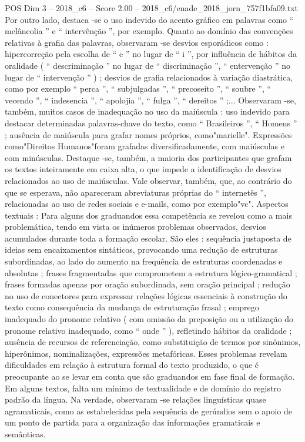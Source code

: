 \begin{textsample}{POS Dim 3 – 2018\_c6 – Score 2.00 – 2018\_c6/enade\_2018\_jorn\_757f1bfa09.txt}
Por outro lado, destaca -se o uso indevido do acento gráfico em palavras como “ melâncolia ” e “ intervênção ”, por exemplo.
Quanto ao domínio das convenções relativas à grafia das palavras, observaram -se desvios esporádicos como : hipercorreção pela escolha de “ e ” no lugar de “ i ”, por influência de hábitos da oralidade ( “ descriminação ” no lugar de “ discriminação ”, “ entervenção ” no lugar de “ intervenção ” ) ; desvios de grafia relacionados à variação diastrática, como por exemplo “ perca ”, “ subjulgadas ”, “ precoseito ”, “ soubre ”, “ vecendo ”, “ indesencia ”, “ apolojia ”, “ fulga ”, “ dereitos ” ;...
Observaram -se, também, muitos casos de inadequação no uso da maiúscula : uso indevido para destacar determinadas palavras-chave do texto, como “ Brasileiros ”, “ Homens ” ; ausência de maiúscula para grafar nomes próprios, como"marielle".
Expressões como"Direitos Humanos"foram grafadas diversificadamente, com maiúsculas e com minúsculas.
Destaque -se, também, a maioria dos participantes que grafam os textos inteiramente em caixa alta, o que impede a identificação de desvios relacionados ao uso de maiúsculas.
Vale observar, também, que, ao contrário do que se esperava, não apareceram abreviaturas próprias do “ internetês ”, relacionadas ao uso de redes sociais e e-mails, como por exemplo"vc".
Aspectos textuais : Para alguns dos graduandos essa competência se revelou como a mais problemática, tendo em vista os inúmeros problemas observados, desvios acumulados durante toda a formação escolar.
São eles : sequência justaposta de ideias sem encaixamentos sintáticos, provocando uma redução de estruturas subordinadas, ao lado do aumento na frequência de estruturas coordenadas e absolutas ; frases fragmentadas que comprometem a estrutura lógico-gramatical ; frases formadas apenas por oração subordinada, sem oração principal ; redução no uso de conectores para expressar relações lógicas essenciais à construção do texto como consequência da mudança de estruturação frasal ; emprego inadequado do pronome relativo ( com omissão da preposição ou a utilização do pronome relativo inadequado, como “ onde ” ), refletindo hábitos da oralidade ; ausência de recursos de referenciação, como substituição de termos por sinônimos, hiperônimos, nominalizações, expressões metafóricas.
Esses problemas revelam dificuldades em relação à estrutura formal do texto produzido, o que é preocupante ao se levar em conta que são graduandos em fase final de formação.
Em alguns textos, falta um mínimo de textualidade e de domínio do registro padrão da língua.
Na verdade, observaram -se relações linguísticas quase agramaticais, como as estabelecidas pela sequência de gerúndios sem o apoio de um ponto de partida para a organização das informações gramaticais e semânticas.

\end{textsample}
